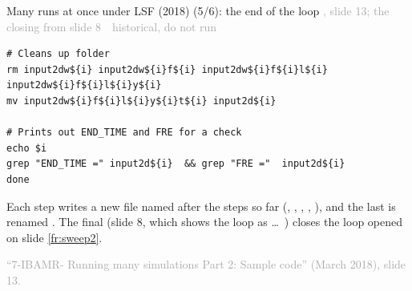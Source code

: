 \documentclass[aspectratio=169,11pt]{beamer}
\newcommand{\sourcecredit}[1]{\vfill\begin{flushright}\tiny\textcolor{DarkGray}{#1}\end{flushright}}
\newcommand{\hist}[1]{{\tiny\sffamily\textcolor{DarkGray}{#1\ \textbullet\ historical, do not run}}\par\nointerlineskip\vspace{0.3mm}}
\begin{document}
\begin{frame}[fragile]{Many runs at once under LSF (2018) (5/6): the end of the loop}
\label{fr:sweep3b}
\hist{, slide 13; the closing  from slide 8}
\begin{lstlisting}[style=hist]
# Cleans up folder
rm input2dw${i} input2dw${i}f${i} input2dw${i}f${i}l${i} input2dw${i}f${i}l${i}y${i}
mv input2dw${i}f${i}l${i}y${i}t${i} input2d${i}

# Prints out END_TIME and FRE for a check
echo $i
grep "END_TIME =" input2d${i}  && grep "FRE ="  input2d${i}
done
\end{lstlisting}
\footnotesize Each step writes a new file named after the steps so far (, , , , ), and the last is renamed . The final  (slide 8, which shows the loop as  \ldots\ ) closes the loop opened on slide \ref{fr:sweep2}.
\sourcecredit{``7-IBAMR- Running many simulations Part 2: Sample code'' (March 2018), slide 13.}
\end{frame}
\end{document}

